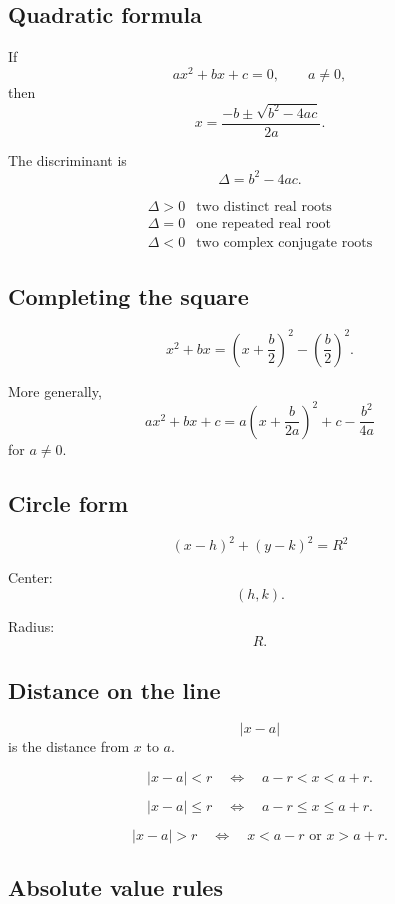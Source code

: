 \subsection*{Quadratic formula}

If
\[
    ax^2+bx+c=0,
    \qquad
    a\ne0,
\]
then
\[
\boxed{
    x=\frac{-b\pm\sqrt{b^2-4ac}}{2a}.
}
\]

The discriminant is
\[
\boxed{
    \Delta=b^2-4ac.
}
\]

\[
\begin{array}{c|c}
\Delta>0 & \text{two distinct real roots}\\
\Delta=0 & \text{one repeated real root}\\
\Delta<0 & \text{two complex conjugate roots}
\end{array}
\]

\subsection*{Completing the square}

\[
\boxed{
    x^2+bx
    =
    \left(x+\frac b2\right)^2-\left(\frac b2\right)^2.
}
\]

More generally,
\[
\boxed{
    ax^2+bx+c
    =
    a\left(x+\frac{b}{2a}\right)^2
    +
    c-\frac{b^2}{4a}
}
\]
for \(a\ne0\).

\subsection*{Circle form}

\[
\boxed{
    (x-h)^2+(y-k)^2=R^2
}
\]

Center:
\[
    (h,k).
\]

Radius:
\[
    R.
\]

\subsection*{Distance on the line}

\[
\boxed{
    |x-a|
}
\]
is the distance from \(x\) to \(a\).

\[
\boxed{
    |x-a|<r
    \quad\Longleftrightarrow\quad
    a-r<x<a+r.
}
\]

\[
\boxed{
    |x-a|\le r
    \quad\Longleftrightarrow\quad
    a-r\le x\le a+r.
}
\]

\[
\boxed{
    |x-a|>r
    \quad\Longleftrightarrow\quad
    x<a-r \text{ or } x>a+r.
}
\]

\subsection*{Absolute value rules}

